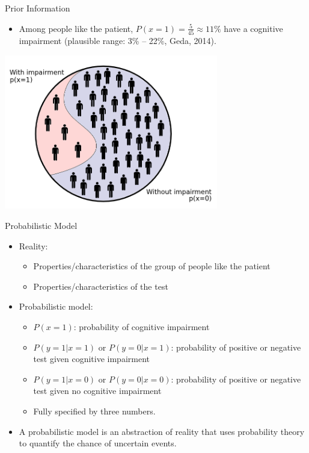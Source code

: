 \documentclass{beamer}
\begin{document}
\begin{frame}{Prior Information}
\begin{itemize}
  \item Among people like the patient, $P(x = 1) = \frac{5}{45} \approx 11\%$ have a cognitive impairment (plausible range: 3\% – 22\%, Geda, 2014).
  \end{itemize}
  \begin{center}
    \includegraphics[width=0.7\textwidth]{prior.png}
  \end{center}
\end{frame}

\begin{frame}{Probabilistic Model}
\begin{itemize}
  \item Reality:
  \begin{itemize}
    \item Properties/characteristics of the group of people like the patient
    \item Properties/characteristics of the test
  \end{itemize}
\item Probabilistic model:
  \begin{itemize}
    \item $P(x = 1)$: probability of cognitive impairment
    \item $P(y = 1|x = 1)$ or $P(y = 0|x = 1)$: probability of positive or negative test given cognitive impairment
    \item $P(y = 1|x = 0)$ or $P(y = 0|x = 0)$: probability of positive or negative test given no cognitive impairment
  \item Fully specified by three numbers.
  \end{itemize}

  \item A probabilistic model is an abstraction of reality that uses probability theory to quantify the chance of uncertain events.
\end{itemize}
\end{frame}
\end{document}
